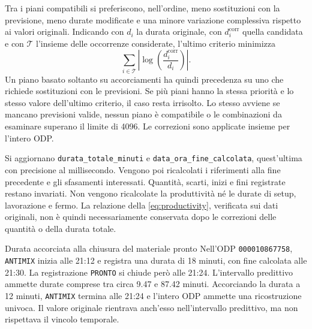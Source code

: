 Tra i piani compatibili si preferiscono, nell'ordine, meno sostituzioni con la previsione, meno durate modificate e una minore variazione complessiva rispetto ai valori originali. Indicando con $d_i$ la durata originale, con $d_i^{\mathrm{corr}}$ quella candidata e con $\mathcal{T}$ l'insieme delle occorrenze considerate, l'ultimo criterio minimizza
\begin{equation}
\label{eq:duration-correction-change}
\sum_{i\in\mathcal{T}}\left\lvert\log\left(\frac{d_i^{\mathrm{corr}}}{d_i}\right)\right\rvert.
\end{equation}
Un piano basato soltanto su accorciamenti ha quindi precedenza su uno che richiede sostituzioni con le previsioni. Se più piani hanno la stessa priorità e lo stesso valore dell'ultimo criterio, il caso resta irrisolto. Lo stesso avviene se mancano previsioni valide, nessun piano è compatibile o le combinazioni da esaminare superano il limite di \num{4096}. Le correzioni sono applicate insieme per l'intero ODP.

Si aggiornano \texttt{durata\_totale\_minuti} e \texttt{data\_ora\_fine\_calcolata}, quest'ultima con precisione al millisecondo. Vengono poi ricalcolati i riferimenti alla fine precedente e gli sfasamenti interessati. Quantità, scarti, inizi e fini registrate restano invariati. Non vengono ricalcolate la produttività né le durate di setup, lavorazione e fermo. La relazione della \cref{eq:productivity}, verificata sui dati originali, non è quindi necessariamente conservata dopo le correzioni delle quantità o della durata totale.

\begingroup
{}
\begin{examplebox}{Durata accorciata alla chiusura del materiale pronto}
Nell'ODP \texttt{000010867758}, \texttt{ANTIMIX} inizia alle 21:12 e registra una durata di 18 minuti, con fine calcolata alle 21:30. La registrazione \texttt{PRONTO} si chiude però alle 21:24. L'intervallo predittivo ammette durate comprese tra circa \num{9.47} e \num{87.42} minuti. Accorciando la durata a 12 minuti, \texttt{ANTIMIX} termina alle 21:24 e l'intero ODP ammette una ricostruzione univoca. Il valore originale rientrava anch'esso nell'intervallo predittivo, ma non rispettava il vincolo temporale.
\end{examplebox}
\endgroup

